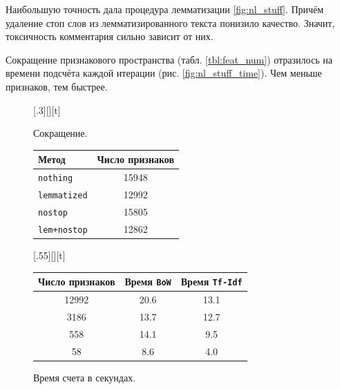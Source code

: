 \documentclass[12pt]{extarticle}
\begin{document}
Наибольшую точность дала процедура лемматизации \ref{fig:nl_stuff}. Причём удаление стоп слов из лемматизированного текста понизило качество. Значит, токсичность комментария сильно зависит от них. 

Сокращение признакового пространства (табл. \ref{tbl:feat_num}) отразилось на времени подсчёта каждой итерации (рис. \ref{fig:nl_stuff_time}). Чем меньше признаков, тем быстрее.

    

\begin{figure}
\begin{floatrow}
[.3\textwidth][\FBheight][t]
{\caption{Сокращение.}
\label{tbl:feat_num}}
{\begin{tabular}{l|c}
        Метод & Число признаков \\
        \hline
        \texttt{nothing} & 15948 \\    
        \texttt{lemmatized} & 12992  \\
        \texttt{nostop} & 15805 \\
        \texttt{lem+nostop} & 12862
    \end{tabular}}\hspace*{1cm}
%
[.55\textwidth][\FBheight][t]
{\caption{Время счета в секундах.}
 \label{fig:time_vect}}
{\begin{tabular}{c|c|c}
        Число признаков & Время \texttt{BoW} & Время \texttt{Tf-Idf} \\
        \hline
        12992 & 20.6 & 13.1 \\
        3186 & 13.7 & 12.7 \\
        558 & 14.1 & 9.5 \\
        58 & 8.6 & 4.0
    \end{tabular}}
\end{floatrow}
\end{figure}
\end{document}
